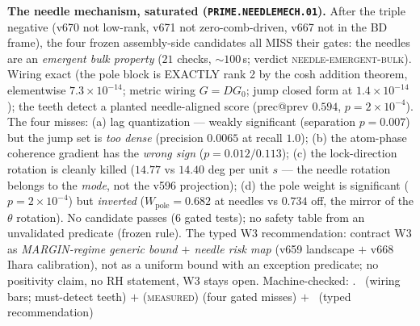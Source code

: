 \documentclass[11pt,a4paper]{article}
\theoremstyle{definition}
\begin{document}
\par\smallskip\noindent\textbf{The needle mechanism, saturated
(\texttt{PRIME.NEEDLEMECH.01}).}
After the triple negative (v670 not low-rank, v671 not
zero-comb-driven, v667 not in the BD frame), the four frozen
assembly-side candidates all MISS their gates: the needles are an
\emph{emergent bulk property} ($21$ checks, ${\sim}100$\,s; verdict
\textsc{needle-emergent-bulk}).  Wiring exact (the pole block is
EXACTLY rank 2 by the cosh addition theorem, elementwise
$7.3\times10^{-14}$; metric wiring $G=DG_0$; jump closed form at
$1.4\times10^{-14}$); the teeth detect a planted needle-aligned
score (prec@prev $0.594$, $p=2\times10^{-4}$).  The four misses:
(a) lag quantization --- weakly significant (separation $p=0.007$)
but the jump set is \emph{too dense} (precision $0.0065$ at recall
$1.0$); (b) the atom-phase coherence gradient has the \emph{wrong
sign} ($p=0.012/0.113$); (c) the lock-direction rotation is cleanly
killed ($14.77$ vs $14.40$ deg per unit $s$ --- the needle rotation
belongs to the \emph{mode}, not the v596 projection); (d) the pole
weight is significant ($p=2\times10^{-4}$) but \emph{inverted}
($W_{\mathrm{pole}}=0.682$ at needles vs $0.734$ off, the mirror of
the $\theta$ rotation).  No candidate passes (6 gated tests); no
safety table from an unvalidated predicate (frozen rule).  The typed
W3 recommendation: contract W3 as \emph{MARGIN-regime generic bound
$+$ needle risk map} (v659 landscape $+$ v668 Ihara calibration),
not as a uniform bound with an exception predicate; no positivity
claim, no RH statement, W3 stays open.
Machine-checked: .
\mE\ (wiring bars; must-detect teeth) $+$ (\textsc{measured}) (four
gated misses) $+$ \mC\ (typed recommendation)
\par\smallskip
\end{document}

